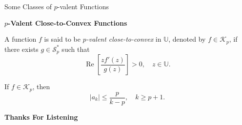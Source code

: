 \documentclass{beamer}
\newcommand{\U}{\mathbb{U}}
\DeclareMathOperator{\re}{Re}
\begin{document}
	\begin{frame}{Some Classes of $p$-valent Functions}
		
		\textbf{$p$-Valent Close-to-Convex Functions}
		
		\begin{definition}
			A function $f$ is said to be \emph{$p$-valent close-to-convex} in $\U$, denoted by $f \in \mathcal{K}_p$, if there exists $g \in \mathcal{S}_p^*$ such that
			\[
			\re\left[\frac{z f'(z)}{g(z)}\right] > 0, \quad z \in \U.
			\]
		\end{definition}
		

		
		\begin{theorem}
			If $f \in \mathcal{K}_p$, then
			\[
			|a_k| \le \frac{p}{k-p}, \quad k \ge p+1.
			\]
		\end{theorem}
	\end{frame}
	
	\begin{frame}{}
		\centering
		\Huge
		\textbf{Thanks For Listening}
	\end{frame}
\end{document}
